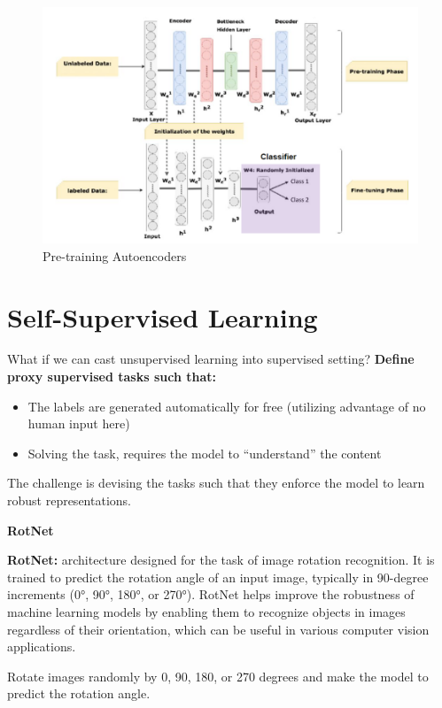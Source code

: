 \begin{figure}[h!t]
    \centering
    \includegraphics[width=0.6\linewidth]{pretrainae.png}
    \caption{Pre-training Autoencoders}
    \label{fig:enter-label}
\end{figure}

\section{Self-Supervised Learning}

What if we can cast unsupervised learning into supervised setting? \textbf{Define proxy supervised tasks such that:}
\begin{itemize}
    \item The labels are generated automatically for free (utilizing advantage of no human input here)
    \item Solving the task, requires the model to “understand” the content
\end{itemize}
The challenge is devising the tasks such that they enforce the model to learn robust
representations.\\

\newpage

\noindent\textbf{RotNet}

\begin{definition}
     \textbf{RotNet:} architecture designed for the task of image rotation recognition. It is trained to predict the rotation angle of an input image, typically in 90-degree increments (0°, 90°, 180°, or 270°). RotNet helps improve the robustness of machine learning models by enabling them to recognize objects in images regardless of their orientation, which can be useful in various computer vision applications.
\end{definition}

\begin{idea}
    Rotate images randomly by 0, 90, 180, or 270 degrees and make the model to
predict the rotation angle.
\end{idea}

